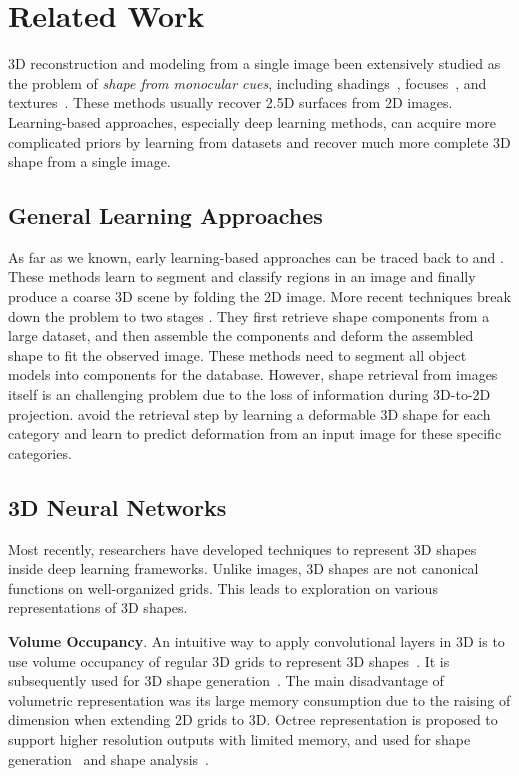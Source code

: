 \section{Related Work}
3D reconstruction and modeling from a single image  been extensively studied as the problem of \emph{shape from monocular cues}, including shadings~\cite{shapefromshadingsurvey}, focuses~\cite{shapefromdf1,shapefromdf2}, and textures~\cite{Aloimonos1988}. 
These methods usually recover 2.5D surfaces from 2D images. 
Learning-based approaches, especially deep learning methods, can acquire more complicated priors by learning from datasets and recover much more complete 3D shape from a single image.
 
\subsection{General Learning Approaches}
As far as we known, early learning-based approaches can be traced back to \cite{Hoiem2007} and \cite{learn3D2007}. These methods learn to segment and classify regions in an image and finally produce a coarse 3D scene by folding the 2D image.
%
More recent techniques break down the problem to two stages \cite{Su:2014,jointimgshape}. They first retrieve shape components from a large dataset, and then assemble the components and deform the assembled shape to fit the observed image. These methods need to segment all object models into components for the database.
%
However, shape retrieval from images itself is an challenging problem due to the loss of information during 3D-to-2D projection. 
\cite{imgrecon15} avoid the retrieval step by learning a deformable 3D shape for each category and learn to predict deformation from an input image for these specific categories.
%
\subsection{3D Neural Networks}
Most recently, researchers have developed techniques to represent 3D shapes inside deep learning frameworks. Unlike images, 3D shapes are not canonical functions on well-organized grids.
This leads to exploration on various representations of 3D shapes.

\noindent\textbf{Volume Occupancy}. 
An intuitive way to apply convolutional layers in 3D is to use volume occupancy of regular 3D grids to represent 3D shapes~\cite{3dshapenet}. It is subsequently used for 3D shape generation~\cite{3DR2N2,learnobj}.
%
The main disadvantage of volumetric representation was its large memory consumption due to the raising of dimension when extending 2D grids to 3D. 
Octree representation is proposed to support higher resolution outputs with limited memory, and used for shape generation~\cite{octreegen} and shape analysis~\cite{ocnn}.

